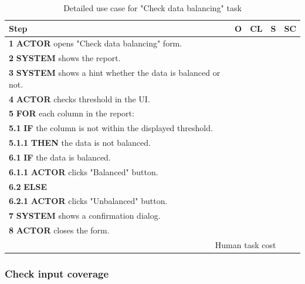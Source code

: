 \begin{table}[H]
\centering
\begin{tabularx}{\textwidth}{|X|c|c|c|c|}
\hline
\textbf{Step} & \textbf{O} & \textbf{CL} & \textbf{S} & \textbf{SC} \\
\hline
\textbf{1} \textbf{ACTOR} opens "Check data balancing" form. & & & & \\
\hline
\textbf{2} \textbf{SYSTEM} shows the report. & & & & \\
\hline
\textbf{3} \textbf{SYSTEM} shows a hint whether the data is balanced or not. & & & & \\
\hline
\textbf{4} \textbf{ACTOR} checks threshold in the UI. & & & & \\
\hline
\textbf{5} \textbf{FOR} each column in the report: & & & & \\
\hline
\textbf{5.1} \textbf{IF} the column is not within the displayed threshold. & & & & \\
\hline
\textbf{5.1.1} \textbf{THEN} the data is not balanced. & & & & \\
\hline
\textbf{6.1} \textbf{IF} the data is balanced. & & & & \\
\hline
\textbf{6.1.1} \textbf{ACTOR} clicks "Balanced" button. & & & & \\
\hline
\textbf{6.2} \textbf{ELSE} & & & & \\
\hline
\textbf{6.2.1} \textbf{ACTOR} clicks "Unbalanced" button. & & & & \\
\hline
\textbf{7} \textbf{SYSTEM} shows a confirmation dialog. & & & & \\
\hline
\textbf{8} \textbf{ACTOR} closes the form. & & & & \\
\hline
\multicolumn{4}{|r|}{Human task cost} & \\
\hline
\end{tabularx}
\caption{Detailed use case for "Check data balancing" task}
\label{table:check_data_balancing}
\end{table}

\subsubsection{Check input coverage}


